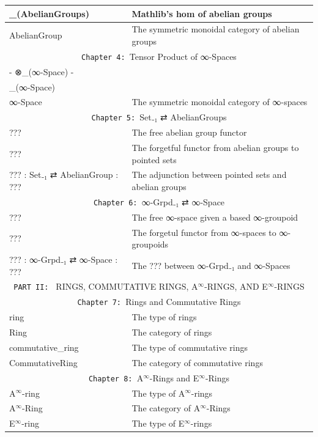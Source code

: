 \documentclass{book}
\theoremstyle{definition}
\begin{document}
{\begin{longtable}{|| l || l ||}
\hline
[-,-]\_(AbelianGroups) & Mathlib's hom of abelian groups\\
\hline
AbelianGroup & The symmetric monoidal category of abelian groups\\
\hline \hline
\multicolumn{2}{||c||}{\texttt{Chapter 4: }Tensor Product of ∞-Spaces} \\
\hline \hline
- ⊗\_(∞-Space) - &  \\
\hline
[-,-]\_(∞-Space) &  \\
\hline
∞-Space & The symmetric monoidal category of ∞-spaces \\
\hline \hline
 \multicolumn{2}{||c||}{\texttt{Chapter 5: }Set₋₁ ⇄ AbelianGroups} \\
\hline \hline
??? & The free abelian group functor \\
 \hline
??? & The forgetful functor from abelian groups to pointed sets \\
 \hline
??? : Set₋₁ ⇄ AbelianGroup : ??? & The adjunction between pointed sets and abelian groups \\
\hline \hline
 \multicolumn{2}{||c||}{\texttt{Chapter 6: }∞-Grpd₋₁ ⇄ ∞-Space} \\
\hline \hline
??? & The free ∞-space given a based ∞-groupoid \\
\hline
??? & The forgetul functor from ∞-spaces to ∞-groupoids \\
\hline
??? : ∞-Grpd₋₁ ⇄ ∞-Space : ??? & The ??? between ∞-Grpd₋₁ and ∞-Spaces \\
\hline \hline
\multicolumn{2}{||c||}{\texttt{PART II: } RINGS, COMMUTATIVE RINGS, A${}^{\infty}$-RINGS, AND E${}^{\infty}$-RINGS} \\
\hline \hline
\multicolumn{2}{||c||}{\texttt{Chapter 7: }Rings and Commutative Rings} \\
\hline \hline
ring & The type of rings \\
 \hline
Ring & The category of rings \\
\hline
commutative\_ring & The type of commutative rings  \\
\hline
CommutativeRing & The category of commutative rings \\
 \hline \hline
  \multicolumn{2}{||c||}{\texttt{Chapter 8: }A${}^{\infty}$-Rings and E${}^{\infty}$-Rings} \\
\hline \hline
A${}^{\infty}$-ring & The type of A${}^{\infty}$-rings \\
\hline
A${}^{\infty}$-Ring & The category of A${}^{\infty}$-Rings \\
 \hline
E${}^{\infty}$-ring  & The type of E${}^{\infty}$-rings \\

\end{longtable}}
\end{document}
